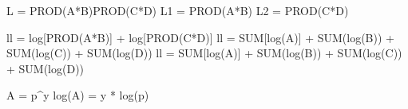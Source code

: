 \begin{comment}
\item \underline{Capability Change} is a summed measure of the change in capabilities in both disputants over their capabilities in the previous year.
\item \underline{Conflict History} accounts for the history of conflict between the two disputants by taking the ratio of the number of MIDs previously fought by the two disputants to the age of the dyad.
\item \underline{One Democracy} is a dummy variable coded one if at least one state has a Polity score of 6 or higher.
\item \underline{Two Democracies} is a dummy variable coded one if both states have a Polity score of 6 or higher.
\item \underline{Contiguity} is a dummy variable coded one if the disputants are contiguous states, defined by the COW Direct Contiguity Data Set version 3.0 \citep{stinnett2002}.
\end{singlespace}
\end{itemize}
\end{comment}

\begin{comment}
Table \ref{tab_sim_60_10_haz} presents the estimated hazard coefficients ($\beta_i$) for each of the models run. 
\begin{table}
\caption{Average Estimates of Hazard Coefficients for Simulated Datasets}
\label{tab_sim_60_10_haz}

\end{table}

\begin{table}
\caption{Average Estimates of Latency Coefficients for Simulated Datasets}
\label{tab_sim_60_10_lat}

\end{table}
\end{comment}



L = PROD(A*B)PROD(C*D)
L1 = PROD(A*B)
L2 = PROD(C*D)

ll = log[PROD(A*B)] + log[PROD(C*D)]
ll = {SUM[log(A)] + SUM(log(B))} + {SUM(log(C)) + SUM(log(D))}
ll = SUM[log(A)] + SUM(log(B)) + SUM(log(C)) + SUM(log(D))

A = p^y
log(A) = y * log(p)

